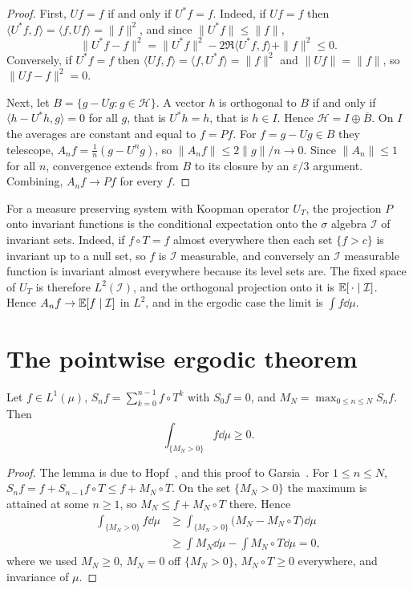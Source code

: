 \begin{proof}
First, $Uf = f$ if and only if $U^*f = f$. Indeed, if $Uf = f$ then $\langle U^*f,f\rangle = \langle f,Uf\rangle = \|f\|^2$, and since $\|U^*f\|\leq\|f\|$,
\[
\|U^*f-f\|^2 = \|U^*f\|^2-2\Re\langle U^*f,f\rangle+\|f\|^2\leq0.
\]
Conversely, if $U^*f = f$ then $\langle Uf,f\rangle = \langle f,U^*f\rangle = \|f\|^2$ and $\|Uf\| = \|f\|$, so $\|Uf-f\|^2 = 0$.

Next, let $B = \{g-Ug:g\in\mathcal{H}\}$. A vector $h$ is orthogonal to $B$ if and only if $\langle h-U^*h,g\rangle = 0$ for all $g$, that is $U^*h = h$, that is $h\in I$. Hence $\mathcal{H} = I\oplus\overline{B}$. On $I$ the averages are constant and equal to $f = Pf$. For $f = g-Ug\in B$ they telescope, $A_nf = \frac1n(g-U^ng)$, so $\|A_nf\|\leq2\|g\|/n\to0$. Since $\|A_n\|\leq1$ for all $n$, convergence extends from $B$ to its closure by an $\varepsilon/3$ argument. Combining, $A_nf\to Pf$ for every $f$.
\end{proof}

For a measure preserving system with Koopman operator $U_T$, the projection $P$ onto invariant functions is the conditional expectation onto the $\sigma$ algebra $\mathcal{I}$ of invariant sets. Indeed, if $f\circ T = f$ almost everywhere then each set $\{f>c\}$ is invariant up to a null set, so $f$ is $\mathcal{I}$ measurable, and conversely an $\mathcal{I}$ measurable function is invariant almost everywhere because its level sets are. The fixed space of $U_T$ is therefore $L^2(\mathcal{I})$, and the orthogonal projection onto it is $\mathbb{E}[\,\cdot\mid\mathcal{I}]$. Hence $A_nf\to\mathbb{E}[f\mid\mathcal{I}]$ in $L^2$, and in the ergodic case the limit is $\int f\dd\mu$.

\section{The pointwise ergodic theorem}

\begin{lemma}
\label{lem:maximal_ergodic}
Let $f\in L^1(\mu)$, $S_nf = \sum_{k=0}^{n-1}f\circ T^k$ with $S_0f = 0$, and $M_N = \max_{0\leq n\leq N}S_nf$. Then
\[
\int_{\{M_N>0\}}f\dd\mu\geq0.
\]
\end{lemma}

\begin{proof}
The lemma is due to Hopf~\cite{hopf1937}, and this proof to Garsia~\cite{garsia1965}. For $1\leq n\leq N$, $S_nf = f+S_{n-1}f\circ T\leq f+M_N\circ T$. On the set $\{M_N>0\}$ the maximum is attained at some $n\geq1$, so $M_N\leq f+M_N\circ T$ there. Hence
\[
\begin{aligned}\int_{\{M_N>0\}}f\dd\mu&\geq\int_{\{M_N>0\}}\big(M_N-M_N\circ T\big)\dd\mu\\ &\geq\int M_N\dd\mu-\int M_N\circ T\dd\mu = 0,\end{aligned}
\]
where we used $M_N\geq0$, $M_N = 0$ off $\{M_N>0\}$, $M_N\circ T\geq0$ everywhere, and invariance of $\mu$.
\end{proof}

